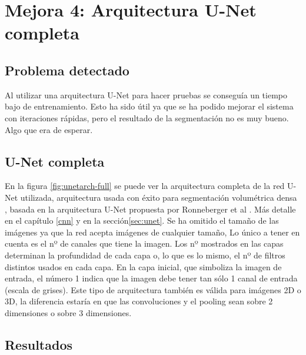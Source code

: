 \chapter{Mejora 4: Arquitectura U-Net completa}\label{full_unet}

\section{Problema detectado}\label{sec:full_unet_problem}

Al utilizar una arquitectura U-Net para hacer pruebas se conseguía un tiempo bajo de entrenamiento. Esto ha sido útil ya que se ha podido mejorar el sistema con iteraciones rápidas, pero el resultado de la segmentación no es muy bueno. Algo que era de esperar.


\section{U-Net completa}\label{sec:full_unet_change}

En la figura \ref{fig:unetarch-full} se puede ver la arquitectura completa de la red U-Net utilizada, arquitectura usada con éxito para segmentación volumétrica densa \cite{Cicek2016}, basada en la arquitectura U-Net propuesta por Ronneberger et al \cite{Ronneberger2015}. Más detalle en el capítulo \ref{cnn} y en la sección\ref{sec:unet}. Se ha omitido el tamaño de las imágenes ya que la red acepta imágenes de cualquier tamaño, Lo único a tener en cuenta es el nº de canales que tiene la imagen. Los nº mostrados en las capas determinan la profundidad de cada capa o, lo que es lo mismo, el nº de filtros distintos usados en cada capa. En la capa inicial, que simboliza la imagen de entrada, el número 1 indica que la imagen debe tener tan sólo 1 canal de entrada (escala de grises). Este tipo de arquitectura también es válida para imágenes 2D o 3D, la diferencia estaría en que las convoluciones y el pooling sean sobre 2 dimensiones o sobre 3 dimensiones.


\section{Resultados}\label{sec:full_unet_resultados}


